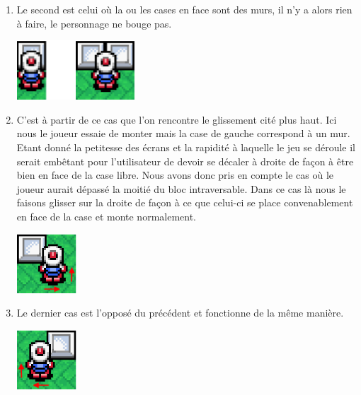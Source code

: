 {\begin{enumerate}
\begin{enumerate}
				  		  \item Le second est celui où la ou les cases en face sont des murs, il
				  		  n'y a alors rien à faire, le personnage ne bouge pas.
				  		  				  		  
				  		  	\begin{center}						
								\includegraphics[width=168px,height=84px]{Developpement/Img/ko2.eps}
							\end{center}
							
				  		  \item C'est à partir de ce cas que l'on rencontre le glissement cité
				  		  plus haut.
				  		  Ici nous le joueur essaie de monter mais la case de gauche correspond à un
				  		  mur. Etant donné la petitesse des écrans et la rapidité à laquelle le
				  		  jeu se déroule il serait embêtant pour l'utilisateur de devoir se
				  		  décaler à droite de façon à être bien en face de la case libre.
				  		  Nous avons donc pris en compte le cas où le joueur aurait dépassé la
				  		  moitié du bloc intraversable. Dans ce cas là nous le faisons glisser
				  		  sur la droite de façon à ce que celui-ci se place convenablement en
				  		  face de la case et monte normalement.
				  		  
				  		  	\begin{center}						
								\includegraphics[width=84px,height=84px]{Developpement/Img/ko3.eps}
							\end{center}
				  		  
				  		  \item Le dernier cas est l'opposé du précédent et fonctionne de la
				  		  même manière.
				  		  
				  		  	\begin{center}						
								\includegraphics[width=84px,height=84px]{Developpement/Img/ko4.eps}
							\end{center}
				  		  

\end{enumerate}
\end{enumerate}}
